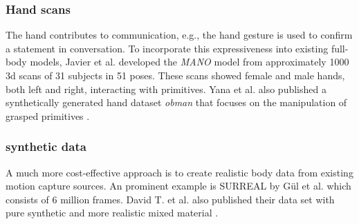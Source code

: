 \subsubsection{Hand scans}
The hand contributes to communication, e.g., the hand gesture is used to confirm a statement in conversation. To incorporate this expressiveness into existing full-body models, Javier et al. developed the \emph{MANO} model from approximately 1000 3d scans of 31 subjects in 51 poses. These scans showed female and male hands, both left and right, interacting with primitives. \cite{mano} 
Yana et al. also published a synthetically generated hand dataset \emph{obman} that focuses on the manipulation of grasped primitives \cite{obman}.

\subsubsection{synthetic data}
A much more cost-effective approach is to create realistic body data from existing motion capture sources. An prominent example is SURREAL by Gül et al. which consists of 6 million frames\cite{surreal}. David T. et al. also published their data set with pure synthetic and more realistic mixed material \cite{ltsh}.



\cite{mpii}